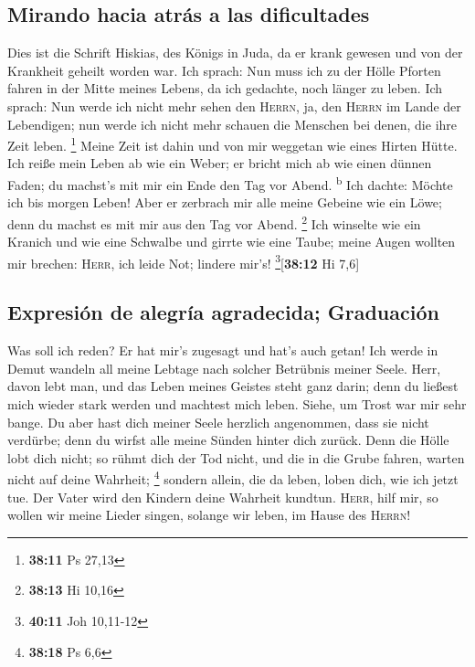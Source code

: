 \hypertarget{mirando-hacia-atruxe1s-a-las-dificultades}{%
\subsection{Mirando hacia atrás a las
dificultades}\label{mirando-hacia-atruxe1s-a-las-dificultades}}

 Dies ist die Schrift Hiskias, des Königs in Juda, da er
krank gewesen und von der Krankheit geheilt worden war. 
Ich sprach: Nun muss ich zu der Hölle Pforten fahren in der Mitte meines
Lebens, da ich gedachte, noch länger zu leben.  Ich
sprach: Nun werde ich nicht mehr sehen den \textsc{Herrn}, ja, den
\textsc{Herrn} im Lande der Lebendigen; nun werde ich nicht mehr schauen
die Menschen bei denen, die ihre Zeit leben. \footnote{\textbf{38:11} Ps
  27,13}  Meine Zeit ist dahin und von mir weggetan wie
eines Hirten Hütte. Ich reiße mein Leben ab wie ein Weber; er bricht
mich ab wie einen dünnen Faden; du machst's mit mir ein Ende den Tag vor
Abend. \textsuperscript{b}  Ich dachte: Möchte ich bis
morgen Leben! Aber er zerbrach mir alle meine Gebeine wie ein Löwe; denn
du machst es mit mir aus den Tag vor Abend. \footnote{\textbf{38:13} Hi
  10,16}  Ich winselte wie ein Kranich und wie eine
Schwalbe und girrte wie eine Taube; meine Augen wollten mir brechen:
\textsc{Herr}, ich leide Not; lindere mir's!
\footnote{\textbf{40:11} Joh 10,11-12}{[}\textbf{38:12} Hi 7,6{]}

\hypertarget{expresiuxf3n-de-alegruxeda-agradecida-graduaciuxf3n}{%
\subsection{Expresión de alegría agradecida;
Graduación}\label{expresiuxf3n-de-alegruxeda-agradecida-graduaciuxf3n}}

 Was soll ich reden? Er hat mir's zugesagt und hat's auch
getan! Ich werde in Demut wandeln all meine Lebtage nach solcher
Betrübnis meiner Seele.  Herr, davon lebt man, und das
Leben meines Geistes steht ganz darin; denn du ließest mich wieder stark
werden und machtest mich leben.  Siehe, um Trost war mir
sehr bange. Du aber hast dich meiner Seele herzlich angenommen, dass sie
nicht verdürbe; denn du wirfst alle meine Sünden hinter dich zurück.
 Denn die Hölle lobt dich nicht; so rühmt dich der Tod
nicht, und die in die Grube fahren, warten nicht auf deine Wahrheit;
\footnote{\textbf{38:18} Ps 6,6}  sondern allein, die da
leben, loben dich, wie ich jetzt tue. Der Vater wird den Kindern deine
Wahrheit kundtun.  \textsc{Herr}, hilf mir, so wollen wir
meine Lieder singen, solange wir leben, im Hause des \textsc{Herrn}!

